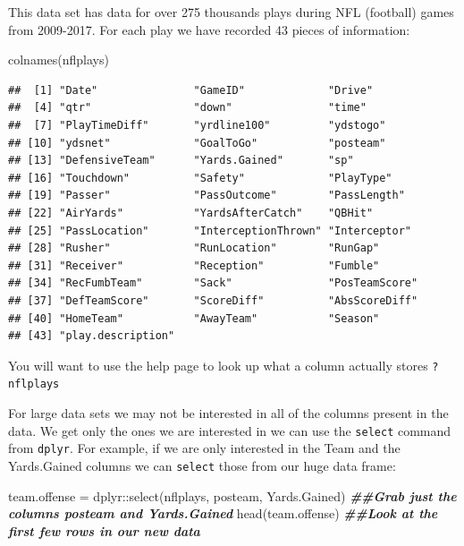 \documentclass[
]{book}
\newenvironment{Shaded}{\begin{snugshade}}{\end{snugshade}}
\newcommand{\DocumentationTok}[1]{\textcolor[rgb]{0.56,0.35,0.01}{\textbf{\textit{#1}}}}
\newcommand{\FunctionTok}[1]{\textcolor[rgb]{0.00,0.00,0.00}{#1}}
\newcommand{\NormalTok}[1]{#1}
\newcommand{\OtherTok}[1]{\textcolor[rgb]{0.56,0.35,0.01}{#1}}
\newcommand{\SpecialCharTok}[1]{\textcolor[rgb]{0.00,0.00,0.00}{#1}}
\theoremstyle{definition}
\theoremstyle{definition}
\theoremstyle{definition}
\theoremstyle{definition}
\theoremstyle{remark}
\begin{document}
This data set has data for over 275 thousands plays during NFL (football) games from 2009-2017. For each play we have recorded 43 pieces of information:

\begin{Shaded}
\begin{Highlighting}[]
\FunctionTok{colnames}\NormalTok{(nflplays)}
\end{Highlighting}
\end{Shaded}

\begin{verbatim}
##  [1] "Date"               "GameID"             "Drive"             
##  [4] "qtr"                "down"               "time"              
##  [7] "PlayTimeDiff"       "yrdline100"         "ydstogo"           
## [10] "ydsnet"             "GoalToGo"           "posteam"           
## [13] "DefensiveTeam"      "Yards.Gained"       "sp"                
## [16] "Touchdown"          "Safety"             "PlayType"          
## [19] "Passer"             "PassOutcome"        "PassLength"        
## [22] "AirYards"           "YardsAfterCatch"    "QBHit"             
## [25] "PassLocation"       "InterceptionThrown" "Interceptor"       
## [28] "Rusher"             "RunLocation"        "RunGap"            
## [31] "Receiver"           "Reception"          "Fumble"            
## [34] "RecFumbTeam"        "Sack"               "PosTeamScore"      
## [37] "DefTeamScore"       "ScoreDiff"          "AbsScoreDiff"      
## [40] "HomeTeam"           "AwayTeam"           "Season"            
## [43] "play.description"
\end{verbatim}

You will want to use the help page to look up what a column actually stores \texttt{?nflplays}

For large data sets we may not be interested in all of the columns present in the data. We get only the ones we are interested in we can use the \texttt{select} command from \texttt{dplyr}. For example, if we are only interested in the Team and the Yards.Gained columns we can \texttt{select} those from our huge data frame:

\begin{Shaded}
\begin{Highlighting}[]
\NormalTok{team.offense }\OtherTok{=}\NormalTok{ dplyr}\SpecialCharTok{::}\FunctionTok{select}\NormalTok{(nflplays, posteam, Yards.Gained)  }\DocumentationTok{\#\#Grab just the columns posteam and Yards.Gained}
\FunctionTok{head}\NormalTok{(team.offense)  }\DocumentationTok{\#\#Look at the first few rows in our new data }
\end{Highlighting}
\end{Shaded}
\end{document}
